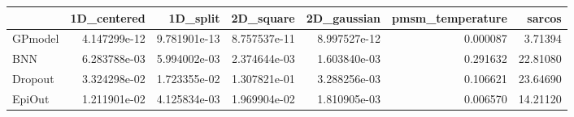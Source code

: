 \begin{tabular}{lrrrrrr}
\toprule
{} &   1D\_centered &      1D\_split &     2D\_square &   2D\_gaussian &  pmsm\_temperature &    sarcos \\
\midrule
GPmodel &  4.147299e-12 &  9.781901e-13 &  8.757537e-11 &  8.997527e-12 &          0.000087 &   3.71394 \\
BNN     &  6.283788e-03 &  5.994002e-03 &  2.374644e-03 &  1.603840e-03 &          0.291632 &  22.81080 \\
Dropout &  3.324298e-02 &  1.723355e-02 &  1.307821e-01 &  3.288256e-03 &          0.106621 &  23.64690 \\
EpiOut  &  1.211901e-02 &  4.125834e-03 &  1.969904e-02 &  1.810905e-03 &          0.006570 &  14.21120 \\
\bottomrule
\end{tabular}
